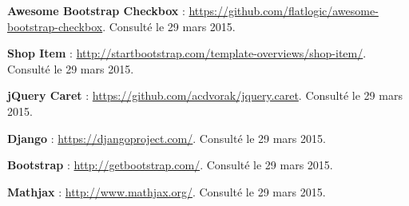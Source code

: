 \documentclass[a4paper,11pt,openany,oneside]{sphinxmanual}
\begin{document}
\textbf{Awesome Bootstrap Checkbox} : \href{https://github.com/flatlogic/awesome-bootstrap-checkbox}{https://github.com/flatlogic/awesome-bootstrap-checkbox}. Consulté le 29 mars 2015.

\textbf{Shop Item} : \href{http://startbootstrap.com/template-overviews/shop-item/}{http://startbootstrap.com/template-overviews/shop-item/}. Consulté le 29 mars 2015.

\textbf{jQuery Caret} : \href{https://github.com/acdvorak/jquery.caret}{https://github.com/acdvorak/jquery.caret}. Consulté le 29 mars 2015.

\textbf{Django} : \href{https://djangoproject.com/}{https://djangoproject.com/}. Consulté le 29 mars 2015.

\textbf{Bootstrap} : \href{http://getbootstrap.com/}{http://getbootstrap.com/}. Consulté le 29 mars 2015.

\textbf{Mathjax} : \href{http://www.mathjax.org/}{http://www.mathjax.org/}. Consulté le 29 mars 2015.
\begingroup
\let\clearpage\relax
\renewcommand*\listfigurename{Table des illustrations}
\listoffigures
\endgroup
\end{document}
